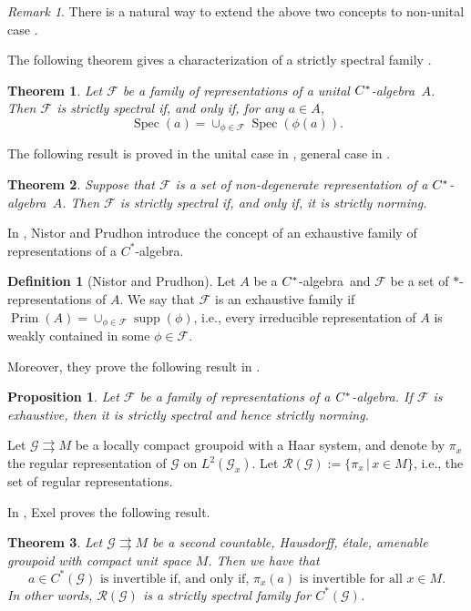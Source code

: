 \documentclass[a4paper]{amsart}
\newcommand{\supp}{\operatorname{supp}}
\newcommand{\Spec}{\operatorname{Spec}}
\newcommand{\tto}{\rightrightarrows}
\newcommand{\Prim}{\operatorname{Prim}}
\newcommand\Cstar{C\sp{\ast}}
\newcommand\Cstara{$\Cstar$-algebra}
\newcommand{\maF}{\mathcal F}
\newcommand{\maG}{\mathcal G}
\newcommand{\maR}{\mathcal R}
\newcommand\<{\langle}
\renewcommand\>{\rangle}
\newtheorem{thm}{Theorem}[section]
\newtheorem{proposition}[theorem]{Proposition}
\theoremstyle{definition}
\newtheorem{defn}[theorem]{Definition}
\theoremstyle{remark}
\newtheorem{remark}[theorem]{Remark}
\begin{document}
\begin{remark}
There is a natural way to extend the above two concepts to non-unital case \cite{NP17}.
\end{remark}

The following theorem gives a characterization of a strictly spectral family \cite[Theorem 3.6]{NP17}.

\begin{thm}
Let $\maF$ be a family of representations of a unital \Cstara \, $A$. Then $\maF$ is strictly spectral if, and only if,
for any $a \in A$,
$$\Spec(a)=\cup_{\phi\in \maF} \Spec(\phi (a)).$$
\end{thm}

The following result is proved in the unital case in \cite{Roch03}, general case in \cite[Theorem 3.4]{NP17}.
\begin{thm}
Suppose that $\maF$ is a set of non-degenerate representation of a \Cstara \, $A$. Then $\maF$ is strictly spectral
if, and only if, it is strictly norming.
\end{thm}

In \cite{NP17}, Nistor and Prudhon introduce the concept of an exhaustive family of representations of a $C^*$-algebra.

\begin{defn}[Nistor and Prudhon]
Let $A$ be a \Cstara\, and $\maF$ be a set of $*$-representations of $A$. We say that $\maF$ is an exhaustive family
if $\Prim(A)=\cup_{\phi\in \maF} \supp(\phi)$, i.e., every irreducible representation of $A$ is weakly contained in some
$\phi \in \maF$.
\end{defn}

Moreover, they prove the following result in \cite[Proposition 3.12]{NP17}.

\begin{proposition}
Let $\maF$ be a family of representations of a \Cstara. If $\maF$ is exhaustive, then it is strictly spectral and hence
strictly norming.
\end{proposition}

Let $\maG \tto M$ be a locally compact groupoid with a Haar system, and denote by $\pi_x$ the regular representation of $\maG$
on $L^2(\maG_x)$. Let $\maR(\maG):=\{\pi_x\,| \, x\in M\}$, i.e., the set of regular representations.

\smallskip
In \cite{Exel14}, Exel proves the following result.

\begin{thm}
Let $\maG \tto M$ be a second countable, Hausdorff, \'etale, amenable groupoid with compact unit space $M$. Then we have that
\begin{equation*}
a \in C^*(\maG)\,\, \text{is invertible if, and only if,} \,\,\pi_x(a) \,\, \text{is invertible for all} \,\, x\in M.
\end{equation*}
In other words, $\maR(\maG)$ is a strictly spectral family for $C^*(\maG)$.
\end{thm}
\end{document}
